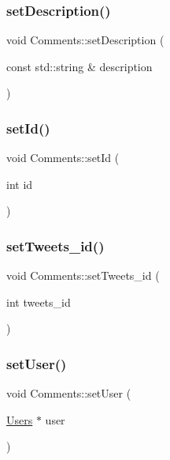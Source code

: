\mbox{\label{class_comments_a422f40e2e51352167d43db4607894566}} 
\subsubsection{\texorpdfstring{set\+Description()}{setDescription()}}
{\footnotesize\ttfamily void Comments\+::set\+Description (\begin{DoxyParamCaption}\item[{const std\+::string \&}]{description }\end{DoxyParamCaption})}

\mbox{\label{class_comments_ac258caa7219cb5a617122ac91656e69b}} 
\subsubsection{\texorpdfstring{set\+Id()}{setId()}}
{\footnotesize\ttfamily void Comments\+::set\+Id (\begin{DoxyParamCaption}\item[{int}]{id }\end{DoxyParamCaption})}

\mbox{\label{class_comments_a25e18b572d0be1db867985e55b3aaff5}} 
\subsubsection{\texorpdfstring{set\+Tweets\+\_\+id()}{setTweets\_id()}}
{\footnotesize\ttfamily void Comments\+::set\+Tweets\+\_\+id (\begin{DoxyParamCaption}\item[{int}]{tweets\+\_\+id }\end{DoxyParamCaption})}

\mbox{\label{class_comments_a8dd0e3690472525bfd8083b28601bdf4}} 
\subsubsection{\texorpdfstring{set\+User()}{setUser()}}
{\footnotesize\ttfamily void Comments\+::set\+User (\begin{DoxyParamCaption}\item[{\hyperlink{class_users}{Users} $\ast$}]{user }\end{DoxyParamCaption})}



